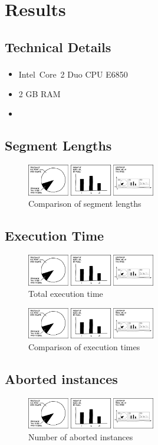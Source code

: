 \chapter{Results}

\section{Technical Details}
\begin{itemize}
  \item Intel\textsuperscript{\textregistered}~Core\texttrademark~2 Duo CPU E6850
  \item 2 GB RAM
  \item {}
\end{itemize}

\section{Segment Lengths}

\begin{figure}[ht]
  \centering
  \includegraphics[width=0.5\textwidth]{img/self_description.png}
  \caption{Comparison of segment lengths\label{fig:segment_lengths}}
\end{figure}

\section{Execution Time}

\begin{figure}[ht]
  \centering
  \includegraphics[width=0.5\textwidth]{img/self_description.png}
  \caption{Total execution time\label{fig:total_time}}
\end{figure}

\begin{figure}[ht]
  \centering
  \includegraphics[width=0.5\textwidth]{img/self_description.png}
  \caption{Comparison of execution times\label{fig:times}}
\end{figure}

\section{Aborted instances}

\begin{figure}[ht]
  \centering
  \includegraphics[width=0.5\textwidth]{img/self_description.png}
  \caption{Number of aborted instances\label{fig:aborted}}
\end{figure}
